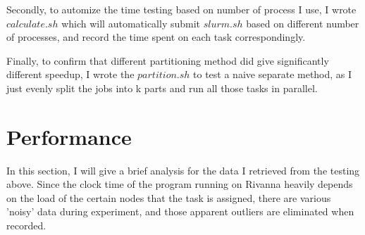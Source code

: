 \documentclass{cs4444}
\begin{document}
	Secondly, to automize the time testing based on number of process I use, I wrote $calculate.sh$ which will automatically submit $slurm.sh$ based on different number of processes, and record the time spent on each task correspondingly.
	
	Finally, to confirm that different partitioning method did give significantly different speedup, I wrote the $partition.sh$ to test a naive separate method, as I just evenly split the jobs into k parts and run all those tasks in parallel.
	
\section{Performance}
	In this section, I will give a brief analysis for the data I retrieved from the testing above.
	Since the clock time of the program running on Rivanna heavily depends on the load of the certain nodes that the task is assigned, there are various 'noisy' data during experiment, and those apparent outliers are eliminated when recorded.
\end{document}
